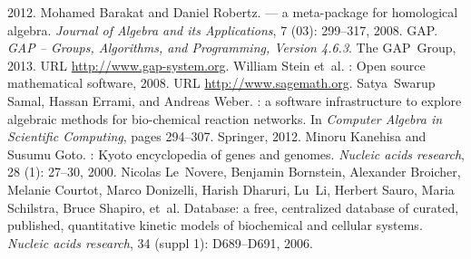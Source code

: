 \documentclass[oribibl,11pt]{article}
\begin{document}
\begin{thebibliography}{21}
  2012.
\vspace*{-10pt}
Mohamed Barakat and Daniel Robertz.
 --- a meta-package for homological algebra.
\newblock \emph{Journal of Algebra and its Applications}, 7
  (03): 299--317, 2008.
\vspace*{-10pt}
GAP.
\newblock \emph{{GAP -- Groups, Algorithms, and Programming, Version 4.6.3}}.
\newblock The GAP~Group, 2013.
\newblock URL \url{http://www.gap-system.org}.
\vspace*{-10pt}
William Stein et~al.
: Open source mathematical software, 2008.
\newblock URL \url{http://www.sagemath.org}.
\vspace*{-10pt}
Satya~Swarup Samal, Hassan Errami, and Andreas Weber.
: a software infrastructure to explore algebraic methods for
  bio-chemical reaction networks.
\newblock In \emph{Computer Algebra in Scientific Computing}, pages 294--307.
  Springer, 2012.
\vspace*{-10pt}
Minoru Kanehisa and Susumu Goto.
: {K}yoto encyclopedia of genes and genomes.
\newblock \emph{Nucleic acids research}, 28 (1): 27--30,
  2000.
\vspace*{-10pt}
Nicolas Le~Novere, Benjamin Bornstein, Alexander Broicher, Melanie Courtot,
  Marco Donizelli, Harish Dharuri, Lu~Li, Herbert Sauro, Maria Schilstra, Bruce
  Shapiro, et~al.
 {D}atabase: a free, centralized database of curated,
  published, quantitative kinetic models of biochemical and cellular systems.
\newblock \emph{Nucleic acids research}, 34 (suppl 1):
  D689--D691, 2006.
\end{thebibliography}
\end{document}
